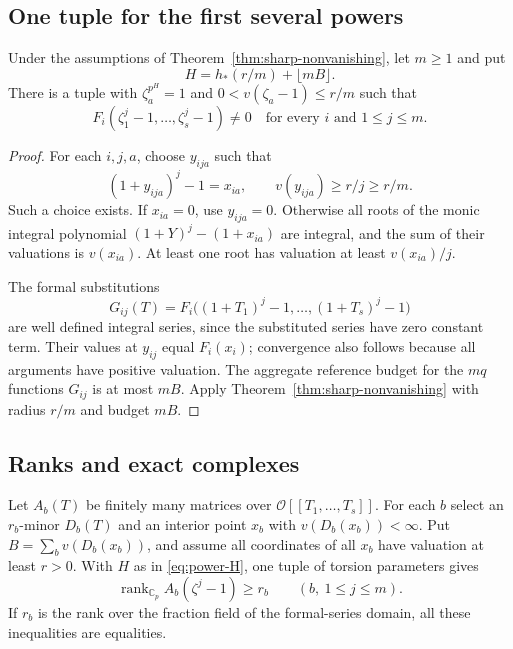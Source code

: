 \subsection{One tuple for the first several powers}

\begin{corollary}
\label{cor:power-orbit}
Under the assumptions of Theorem~\ref{thm:sharp-nonvanishing}, let
$m\geq1$ and put
\begin{equation}
 H=h_*(r/m)+\lfloor mB\rfloor.
 \label{eq:power-H}
\end{equation}
There is a tuple with $\zeta_a^{p^H}=1$ and
$0<v(\zeta_a-1)\leq r/m$ such that
\[
 F_i(\zeta_1^j-1,\ldots,\zeta_s^j-1)\ne0
 \quad\text{for every }i\text{ and }1\leq j\leq m.
\]
\end{corollary}

\begin{proof}
For each $i,j,a$, choose $y_{ija}$ such that
\[
 (1+y_{ija})^j-1=x_{ia},\qquad v(y_{ija})\geq r/j\geq r/m.
\]
Such a choice exists. If $x_{ia}=0$, use $y_{ija}=0$. Otherwise all roots
of the monic integral polynomial $(1+Y)^j-(1+x_{ia})$ are integral, and
the sum of their valuations is $v(x_{ia})$. At least one root has
valuation at least $v(x_{ia})/j$.

The formal substitutions
\[
 G_{ij}(T)=F_i\bigl((1+T_1)^j-1,\ldots,(1+T_s)^j-1\bigr)
\]
are well defined integral series, since the substituted series have zero
constant term. Their values at $y_{ij}$ equal $F_i(x_i)$; convergence
also follows because all arguments have positive valuation. The aggregate
reference budget for the $mq$ functions $G_{ij}$ is at most $mB$.
Apply Theorem~\ref{thm:sharp-nonvanishing} with radius $r/m$ and budget
$mB$.
\end{proof}

\subsection{Ranks and exact complexes}

\begin{corollary}
\label{cor:rank}
Let $A_b(T)$ be finitely many matrices over
$\mathcal O[[T_1,\ldots,T_s]]$. For each $b$ select an $r_b$-minor
$D_b(T)$ and an interior point $x_b$ with
$v(D_b(x_b))<\infty$. Put $B=\sum_bv(D_b(x_b))$, and assume all
coordinates of all $x_b$ have valuation at least $r>0$.
With $H$ as in \eqref{eq:power-H}, one tuple of torsion parameters gives
\[
 \operatorname{rank}_{\mathbb C_p} A_b(\zeta^j-1)\geq r_b
 \qquad(b,\ 1\leq j\leq m).
\]
If $r_b$ is the rank over the fraction field of the formal-series domain,
all these inequalities are equalities.
\end{corollary}

